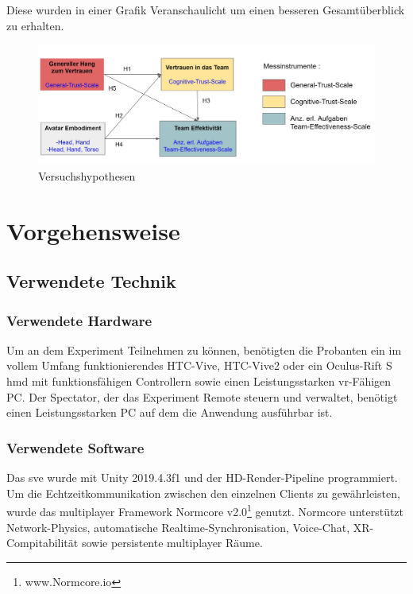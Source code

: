 \documentclass[a4paper,11pt]{article}%
\renewcommand{\\}{\vspace*{0.5\baselineskip} \newline}
\begin{document}
Diese wurden in einer Grafik Veranschaulicht um einen besseren Gesamtüberblick zu erhalten.

\begin{figure}[H]
		\begin{footnotesize}
			\includegraphics[width=\textwidth]{Abbildungen/Versuchshypothesen.JPG}\\
			\caption{Versuchshypothesen}
			\label{Versuchshypothesen}
		\end{footnotesize}
	\end{figure}	

		
	\section{Vorgehensweise}
		\subsection{Verwendete Technik}
			\subsubsection{Verwendete Hardware}
Um an dem Experiment Teilnehmen zu können, benötigten die Probanten ein im vollem Umfang funktionierendes HTC-Vive, HTC-Vive2 oder ein Oculus-Rift S \ac{hmd} mit funktionsfähigen Controllern sowie einen Leistungsstarken \ac{vr}-Fähigen PC. Der Spectator, der das Experiment Remote steuern und verwaltet, benötigt einen Leistungsstarken PC auf dem die Anwendung ausführbar ist.

			\subsubsection{Verwendete Software}
Das \ac{sve} wurde mit Unity 2019.4.3f1 und der HD-Render-Pipeline programmiert. Um die Echtzeitkommunikation zwischen den einzelnen Clients zu gewährleisten, wurde das multiplayer Framework \flqq Normcore v2.0\frqq \footnote{www.Normcore.io} genutzt.
Normcore unterstützt Network-Physics, automatische Realtime-Synchronisation, Voice-Chat, XR-Compitabilität sowie persistente multiplayer Räume.
		
\end{document}
